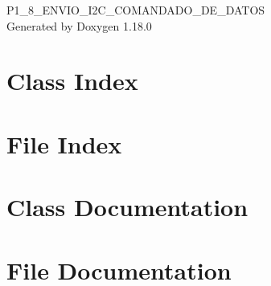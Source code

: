 \documentclass[twoside]{book}
\newcommand{\+}{\discretionary{\mbox{\scriptsize$\hookleftarrow$}}{}{}}
\newcommand{\clearemptydoublepage}{%
    \newpage{\pagestyle{empty}\cleardoublepage}%
  }
\begin{document}
  \raggedbottom
    \hypersetup{pageanchor=false,
                bookmarksnumbered=true,
                pdfencoding=unicode
               }
  \begin{titlepage}
  \vspace*{7cm}
  \begin{center}%
  {\Large P1\+\_\+8\+\_\+\+ENVIO\+\_\+\+I2\+C\+\_\+\+COMANDADO\+\_\+\+DE\+\_\+\+DATOS}\\
  \vspace*{1cm}
  {\large Generated by Doxygen 1.18.0}\\
  \end{center}
  \end{titlepage}
  \clearemptydoublepage
  \tableofcontents
  \clearemptydoublepage
  \hypersetup{pageanchor=true}
\chapter{Class Index}

\chapter{File Index}

\chapter{Class Documentation}


\chapter{File Documentation}



























  \backmatter
  \newpage
  \clearemptydoublepage
  \printindex
\end{document}
